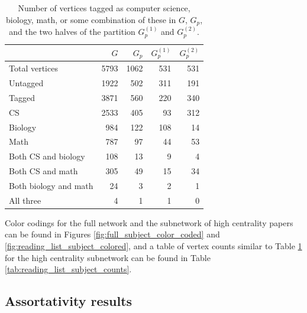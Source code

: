 \documentclass[12pt]{thesis}
\theoremstyle{plain}
\theoremstyle{definition}
\theoremstyle{remark}
\begin{document}
\begin{table}[t]
\centering
\setlength\extrarowheight{3pt}
\begin{tabular}{|l|r|r|r|r|}
\hline & $G$ & $G_p$ & $G_p^{(1)}$ & $G_p^{(2)}$ \\ \hline\hline
Total vertices & 5793 & 1062 & 531 & 531 \\ \hline
Untagged & 1922 & 502 & 311 & 191 \\ \hline
Tagged & 3871 & 560 & 220 & 340 \\ \hline
CS & 2533 & 405 & 93 & 312 \\ \hline
Biology & 984 & 122 & 108 & 14 \\ \hline
Math & 787 & 97 & 44 & 53 \\ \hline
Both CS and biology & 108 & 13 & 9 & 4 \\ \hline
Both CS and math & 305 & 49 & 15 & 34 \\ \hline
Both biology and math & 24 & 3 & 2 & 1 \\ \hline
All three & 4 & 1 & 1 & 0 \\ \hline
\end{tabular}
\caption{Number of vertices tagged as computer science, biology, math, or some combination of these in $G$, $G_p$, and the two halves of the partition $G_p^{(1)}$ and $G_p^{(2)}$.}
\label{tab:subject_counts}
\end{table}

Color codings for the full network and the subnetwork of high centrality papers can be found in Figures \ref{fig:full_subject_color_coded} and \ref{fig:reading_list_subject_colored}, and a table of vertex counts similar to Table \ref{tab:subject_counts} for the high centrality subnetwork can be found in Table \ref{tab:reading_list_subject_counts}.

\subsection{Assortativity results}
\end{document}
